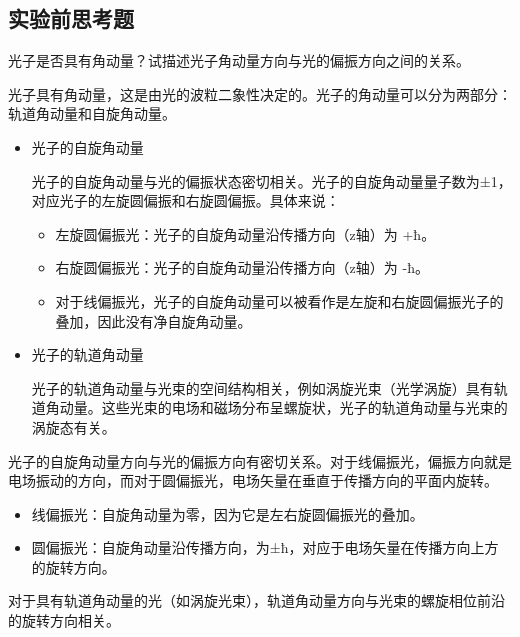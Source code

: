 \documentclass[dvipsnames, svgnames,a4paper,11pt]{article}
\begin{document}
\clearpage

\subsection{实验前思考题}



\begin{question}
	光子是否具有角动量？试描述光子角动量方向与光的偏振方向之间的关系。
\end{question}

	光子具有角动量，这是由光的波粒二象性决定的。光子的角动量可以分为两部分：轨道角动量和自旋角动量。

		\begin{itemize}
			\item 光子的自旋角动量
			
				光子的自旋角动量与光的偏振状态密切相关。光子的自旋角动量量子数为±1，对应光子的左旋圆偏振和右旋圆偏振。具体来说：

				\begin{itemize}
					\item 左旋圆偏振光：光子的自旋角动量沿传播方向（z轴）为 +ħ。
					\item 右旋圆偏振光：光子的自旋角动量沿传播方向（z轴）为 -ħ。
					\item 对于线偏振光，光子的自旋角动量可以被看作是左旋和右旋圆偏振光子的叠加，因此没有净自旋角动量。
				\end{itemize}
			
			\item 光子的轨道角动量
			
				光子的轨道角动量与光束的空间结构相关，例如涡旋光束（光学涡旋）具有轨道角动量。这些光束的电场和磁场分布呈螺旋状，光子的轨道角动量与光束的涡旋态有关。
		\end{itemize}


	光子的自旋角动量方向与光的偏振方向有密切关系。对于线偏振光，偏振方向就是电场振动的方向，而对于圆偏振光，电场矢量在垂直于传播方向的平面内旋转。
		
		\begin{itemize}
			\item 线偏振光：自旋角动量为零，因为它是左右旋圆偏振光的叠加。
			\item 圆偏振光：自旋角动量沿传播方向，为±ħ，对应于电场矢量在传播方向上方的旋转方向。
		\end{itemize}
	
	对于具有轨道角动量的光（如涡旋光束），轨道角动量方向与光束的螺旋相位前沿的旋转方向相关。
\end{document}

